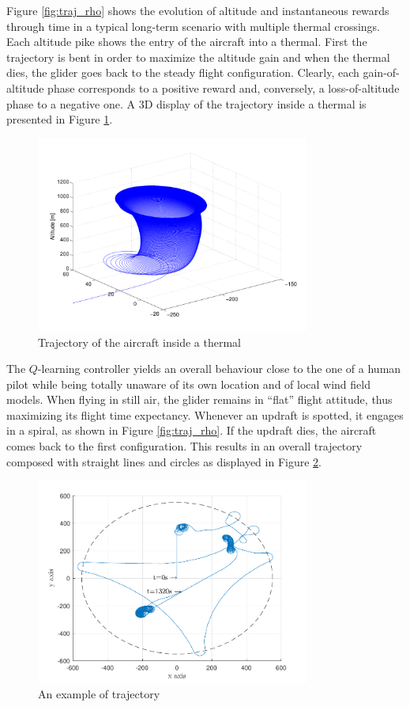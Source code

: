 \documentclass[a4paper, 10pt, conference]{ieeeconf}
\begin{document}
Figure \ref{fig:traj_rho} shows the evolution of altitude and instantaneous rewards through time in a typical long-term scenario with multiple thermal crossings. Each altitude pike shows the entry of the aircraft into a thermal. First the trajectory is bent in order to maximize the altitude gain and when the thermal dies, the glider goes back to the steady flight configuration. Clearly, each gain-of-altitude phase corresponds to a positive reward and, conversely, a loss-of-altitude phase to a negative one. A 3D display of the trajectory inside a thermal is presented in Figure \ref{fig:traj_high_alt}.

\begin{figure}
\begin{center}
 \includegraphics[width=9cm]{img/traj_high_alt.pdf}
\end{center}
 \caption{Trajectory of the aircraft inside a thermal}
 \label{fig:traj_high_alt}
\end{figure}

The $Q$-learning controller yields an overall behaviour close to the one of a human pilot while being totally unaware of its own location and of local wind field models. When flying in still air, the glider remains in ``flat'' flight attitude, thus maximizing its flight time expectancy. Whenever an updraft is spotted, it engages in a spiral, as shown in Figure \ref{fig:traj_rho}. If the updraft dies, the aircraft comes back to the first configuration. This results in an overall trajectory composed with straight lines and circles as displayed in Figure \ref{fig:full_traj}.

\begin{figure}
\begin{center}
 \includegraphics[width=9cm]{img/full_traj.pdf}
\end{center}
\caption{An example of trajectory}
\label{fig:full_traj}
\end{figure}
\end{document}
